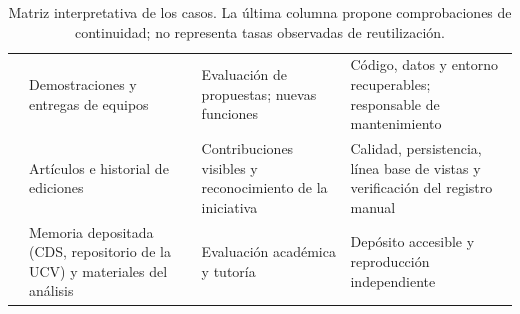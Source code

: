 \begin{table}[tbp]
\caption{Matriz interpretativa de los casos. La última columna propone comprobaciones de continuidad; no representa tasas observadas de reutilización.}\label{tab:matriz}
\begin{tabularx}{\linewidth}{@{}>{\RaggedRight\arraybackslash}p{24mm}YYY@{}}
\toprule
{} &  &  &  \\
\midrule
{} & Demostraciones y entregas de equipos & Evaluación de propuestas; nuevas funciones & Código, datos y entorno recuperables; responsable de mantenimiento \\
\addlinespace
{} & Artículos e historial de ediciones & Contribuciones visibles y reconocimiento de la iniciativa & Calidad, persistencia, línea base de vistas y verificación del registro manual \cite{salud} \\
\addlinespace
{} & Memoria depositada (CDS, repositorio de la UCV) y materiales del análisis & Evaluación académica y tutoría & Depósito accesible y reproducción independiente \\
\bottomrule
\end{tabularx}
\end{table}
